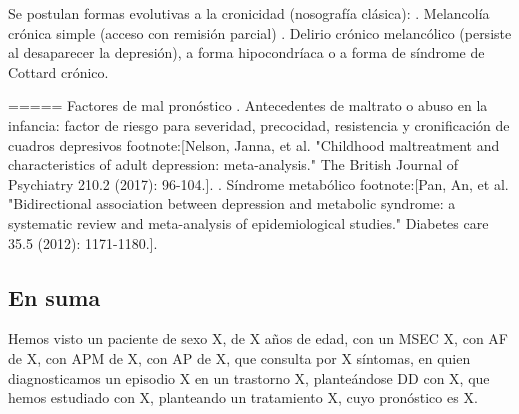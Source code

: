 Se postulan formas evolutivas a la cronicidad (nosografía clásica):
. Melancolía crónica simple (acceso con remisión parcial)
. Delirio crónico melancólico (persiste al desaparecer la depresión), a forma hipocondríaca o a forma de síndrome de Cottard crónico.

===== Factores de mal pronóstico
. Antecedentes de maltrato o abuso en la infancia: factor de riesgo para severidad, precocidad, resistencia y cronificación de cuadros depresivos footnote:[Nelson, Janna, et al. "Childhood maltreatment and characteristics of adult depression: meta-analysis." The British Journal of Psychiatry 210.2 (2017): 96-104.].
. Síndrome metabólico footnote:[Pan, An, et al. "Bidirectional association between depression and metabolic syndrome: a systematic review and meta-analysis of epidemiological studies." Diabetes care 35.5 (2012): 1171-1180.].

\subsection*{En suma}

Hemos visto un paciente de sexo X, de X años de edad, con un MSEC X, con AF de X, con APM de X, con AP de X, que consulta por X síntomas, en quien diagnosticamos un episodio X en un trastorno X, planteándose DD con X, que hemos estudiado con X, planteando un tratamiento X, cuyo pronóstico es X.
